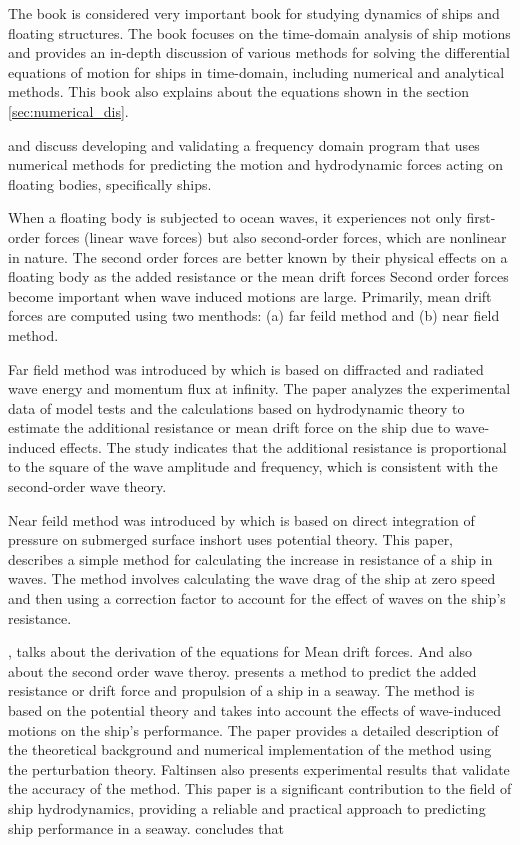 The book \cite{liapis1986time} is considered very important book for studying dynamics of ships and
floating structures. The book focuses on the time-domain analysis of ship motions and provides 
an in-depth discussion of various methods for solving the differential equations of motion 
for ships in time-domain, including numerical and analytical methods. This book also explains about the
equations shown in the section \ref{sec:numerical_dis}.

\cite{guha2013development} and \cite{guha2015estimation} discuss developing and validating a 
frequency domain program that uses numerical methods for predicting the motion and hydrodynamic 
forces acting on floating bodies, specifically ships.

When a floating body is subjected to ocean waves, it experiences not only first-order forces 
(linear wave forces) but also second-order forces, which are nonlinear in nature. 
The second order forces are better known by their physical effects on a floating
body as the added resistance or the mean drift forces
Second order forces become important when wave induced motions are large. 
Primarily, mean drift forces are computed using two menthods:
(a) far feild method and (b) near field method. 

Far field method was introduced by \cite{maruo1957excess} which is based on diffracted and radiated
wave energy and momentum flux at infinity.
The paper analyzes the experimental 
data of model tests and the calculations based on hydrodynamic theory to estimate the additional 
resistance or mean drift force on the ship due to wave-induced effects. The study indicates that the additional 
resistance is proportional to the square of the wave amplitude and frequency, which is 
consistent with the second-order wave theory.

Near feild method was introduced by \cite{boese1970einfache} which is based on direct integration of 
pressure on submerged surface inshort uses potential theory.
This paper, describes a simple method for calculating the increase in resistance of a ship in waves. 
The method involves calculating the wave drag of the ship at zero speed and then using a 
correction factor to account for the effect of waves on the ship's resistance.

\cite{faltinsen1980prediction},  \cite{pinkster1980low} talks about the derivation of the equations 
for Mean drift forces. And also about the second order wave theroy. 
\cite{faltinsen1980prediction} presents a method to predict the added resistance or drift force 
and propulsion of a ship in a seaway. 
The method is based on the potential theory and takes into account the 
effects of wave-induced motions on the ship's performance. The paper provides a detailed 
description of the theoretical background and numerical implementation of the method using
the perturbation theory. 
Faltinsen also presents experimental results that validate the accuracy of the method. 
This paper is a significant contribution to the field of ship hydrodynamics, providing a 
reliable and practical approach to predicting ship performance in a seaway.
\cite{pinkster1980low} concludes that 

